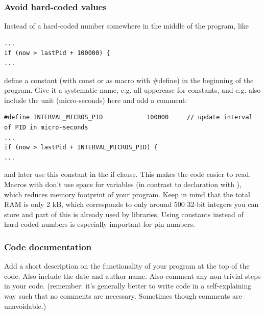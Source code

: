 \subsubsection{Avoid hard-coded values}
Instead of a hard-coded number somewhere in the middle of the program, like \newline
\noindent\begin{minipage}{\textwidth}
\begin{lstlisting}[language=Arduino]
...
if (now > lastPid + 100000) {
...
\end{lstlisting}
\end{minipage}
define a constant (with const or as macro with \#define) in the beginning of the program. Give it a systematic name, e.g. all uppercase for constants, and e.g. also include the unit (micro-seconds) here and add a comment: \newline
\noindent\begin{minipage}{\textwidth}
\begin{lstlisting}[language=Arduino]
#define INTERVAL_MICROS_PID            100000     // update interval of PID in micro-seconds
...
if (now > lastPid + INTERVAL_MICROS_PID) {
...
\end{lstlisting}
\end{minipage}
and later use this constant  in the if clause. This makes the code easier to read. Macros with  don't use space for variables (in contrast to declaration with ), which reduces memory footprint of your program. Keep in mind that the total RAM is only 2 kB, which corresponds to only around 500 32-bit integers you can store and part of this is already used by libraries. Using constants instead of hard-coded numbers is especially important for pin numbers.


\subsubsection{Code documentation}
Add a short description on the functionality of your program at the top of the code. Also include the date and author name. Also comment any non-trivial steps in your code. (remember: it's generally better to write code in a self-explaining way such that no comments are necessary. Sometimes though comments are unavoidable.) \newline


